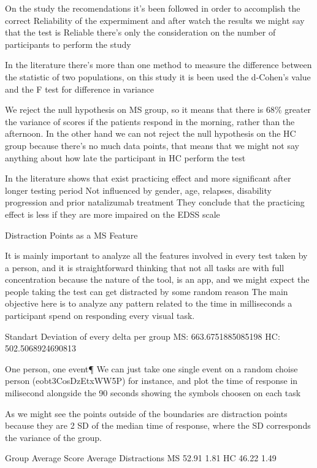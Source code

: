 \documentclass[letterpaper, 10 pt, conference]{ieeeconf}
\begin{document}
On the study the recomendations it's been followed in order to accomplish the correct Reliability of the expermiment and after watch the results we might say that the test is Reliable there's only the consideration on the number of participants to perform the study

In the literature there's more than one method to measure the difference between the statistic of two populations, on this study it is been used the d-Cohen's value and the F test for difference in variance

We reject the null hypothesis on MS group, so it means that there is 68\% greater the variance of scores if the patients respond in the morning, rather than the afternoon.
In the other hand we can not reject the null hypothesis on the HC group because there's no much data points, that means that we might not say anything about how late the participant in HC perform the test

In the literature shows that exist practicing effect and more significant after longer testing period
Not influenced by gender, age, relapses, disability progression and prior natalizumab treatment
They conclude that the practicing effect is less if they are more impaired on the EDSS scale
\vspace{3mm}

Distraction Points as a MS Feature

It is mainly important to analyze all the features involved in every test taken by a person, and it is straightforward thinking that not all tasks are with full concentration because the nature of the tool, is an app, and we might expect the people taking the test can get distracted by some random reason
The main objective here is to analyze any pattern related to the time in milliseconds a participant spend on responding every visual task.

Standart Deviation of every delta per group 
 MS: 663.6751885085198 
 HC: 502.5068924690813
 
  One person, one event¶
We can just take one single event on a random choise person (eobt3CosDzEtxWW5P) for instance, and plot the time of response in milisecond alongside the 90 seconds showing the symbols choosen on each task

As we might see the points outside of the boundaries are distraction points because they are 2 SD of the median time of response, where the SD corresponds the variance of the group.

Group	Average Score	Average Distractions
MS	52.91	1.81
HC	46.22	1.49
\end{document}
